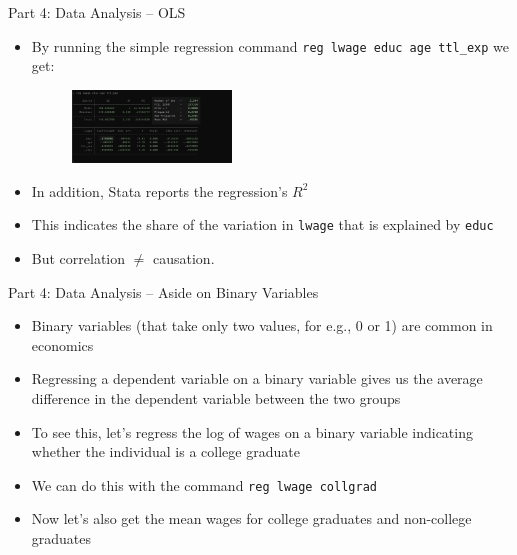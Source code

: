 \documentclass[11pt,notes=hide,aspectratio=169,mathserif]{beamer}
\begin{document}
\begin{frame}{Part 4: Data Analysis -- OLS}
    \begin{itemize}
        \item By running the simple regression command \texttt{reg lwage educ age ttl\_exp} we get:  
        \begin{figure}
            \centering
            \includegraphics[width=0.4\textwidth]{inputs/reg1.png}
        \end{figure}
        \item In addition, Stata reports the regression's $R^2$
        \item This indicates the share of the variation in \texttt{lwage} that is explained by \texttt{educ}
        \item But correlation $\neq$ causation.
        \end{itemize}
\end{frame}

\begin{frame}{Part 4: Data Analysis -- Aside on Binary Variables}
    \begin{itemize}
        \item Binary variables (that take only two values, for e.g., 0 or 1) are common in economics
        \item Regressing a dependent variable on a binary variable gives us the average difference in the dependent variable between the two groups
        \item To see this, let's regress the log of wages on a binary variable indicating whether the individual is a college graduate
        \item We can do this with the command \texttt{reg lwage collgrad}
        \item Now let's also get the mean wages for college graduates and non-college graduates
    \end{itemize}
\end{frame}
\end{document}
